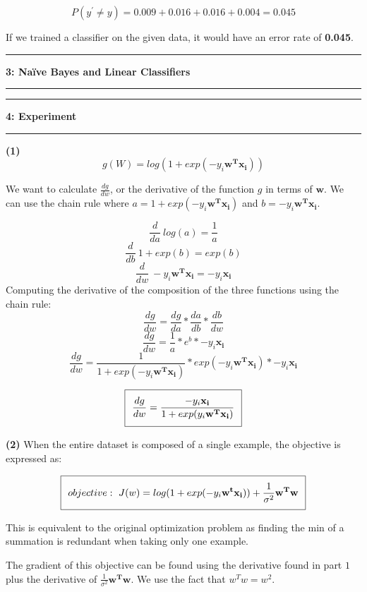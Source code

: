 \documentclass[11pt]{article}
\newcommand\question[2]{\vspace{.25in}\hrule\textbf{#1: #2}\vspace{.5em}\hrule\vspace{.10in}}
\renewcommand\part[1]{\vspace{.10in}\textbf{(#1)}}
\begin{document}
$$P(y^\prime \neq y) = 0.009 + 0.016 + 0.016 + 0.004 = 0.045$$

If we trained a classifier on the given data, it would have an error rate of \textbf{0.045}.

\question{3}{Na\"{i}ve Bayes and Linear Classifiers}

\question{4}{Experiment}

\part{1} 
$$g(W) = log(1 + exp(-y_i\mathbf{w^Tx_i}))$$

We want to calculate $\frac{dg}{dw}$, or the derivative of the function $g$ in terms of $\mathbf{w}$. We can use the chain rule where $a = 1 + exp(-y_i\mathbf{w^Tx_i})$ and $b = -y_i\mathbf{w^Tx_i}$.

$$\frac{d}{da} \ log(a) = \frac{1}{a}$$
$$\frac{d}{db} \ 1 + exp(b)= exp(b)$$
$$\frac{d}{dw} \ -y_i\mathbf{w^Tx_i} = -y_i\mathbf{x_i}$$
Computing the derivative of the composition of the three functions using the chain rule:
$$\frac{dg}{dw} = \frac{dg}{da} * \frac{da}{db} * \frac{db}{dw}$$
$$\frac{dg}{dw} = \frac{1}{a} * e^b * -y_i\mathbf{x_i}$$
$$\frac{dg}{dw} = \frac{1}{1 + exp(-y_i\mathbf{w^Tx_i})} * exp(-y_i\mathbf{w^Tx_i}) * -y_i\mathbf{x_i}$$

\begin{equation}
\setlength\fboxsep{0.25cm}
\setlength\fboxrule{0.4pt}
\boxed{\frac{dg}{dw} = \frac{-y_i\mathbf{x_i}}{1 + exp(y_i\mathbf{w^Tx_i})}}
\end{equation} 

\part{2} When the entire dataset is composed of a single example, the objective is expressed as:

\begin{equation}
\setlength\fboxsep{0.25cm}
\setlength\fboxrule{0.4pt}
\boxed{objective:\ J(w) = log(1 + exp(-y_i\mathbf{w^tx_i})) + \frac{1}{\sigma^2}\mathbf{w^Tw}}
\end{equation}

This is equivalent to the original optimization problem as finding the min of a summation is redundant when taking only one example.

The gradient of this objective can be found using the derivative found in part $1$ plus the derivative of $\frac{1}{\sigma^2}\mathbf{w^Tw}$. We use the fact that $w^Tw = w^2$.
\end{document}
